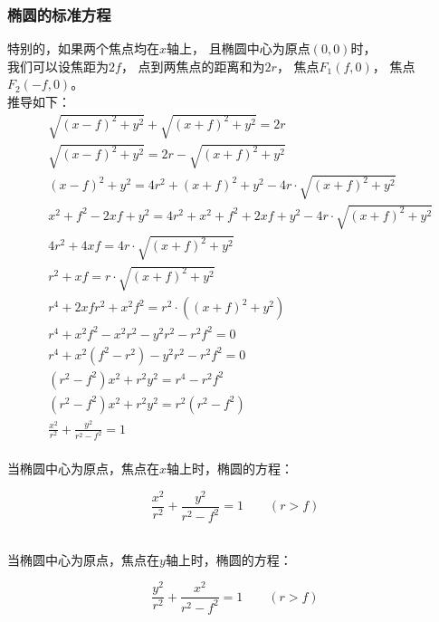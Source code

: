 \documentclass[UTF8]{ctexart}
\begin{document}
\subsubsection{椭圆的标准方程}
    特别的，如果两个焦点均在$x$轴上，
    且椭圆中心为原点$(0,0)$时，\\
    我们可以设焦距为$2f$，
    点到两焦点的距离和为$2r$，
    焦点$F_1(f,0)$，
    焦点$F_2(-f,0)$。\\[3mm]
    推导如下：\vspace{3pt}
    \setcounter{equation}{0}
    \begin{align}
        &\sqrt{(x-f)^2+y^2}+\sqrt{(x+f)^2+y^2}=2r\\[4mm]
        &\sqrt{(x-f)^2+y^2}=2r-\sqrt{(x+f)^2+y^2}\\[4mm]
        &(x-f)^2+y^2=4r^2+(x+f)^2+y^2-4r \cdot \sqrt{(x+f)^2+y^2}\\[4mm]
        &x^2+f^2-2xf+y^2=4r^2+x^2+f^2+2xf+y^2-4r \cdot \sqrt{(x+f)^2+y^2}\\[4mm]
        &4r^2+4xf=4r \cdot \sqrt{(x+f)^2+y^2}\\[4mm]
        &r^2+xf=r \cdot \sqrt{(x+f)^2+y^2}\\[4mm]
        &r^4+2xfr^2+x^2f^2=r^2 \cdot ((x+f)^2+y^2)\\[4mm]
        &r^4+x^2f^2-x^2r^2-y^2r^2-r^2f^2=0\\[4mm]
        &r^4+x^2(f^2-r^2)-y^2r^2-r^2f^2=0\\[4mm]
        &(r^2-f^2)x^2+r^2y^2=r^4-r^2f^2\\[4mm]
        &(r^2-f^2)x^2+r^2y^2=r^2(r^2-f^2)\\[4mm]
        &\frac{x^2}{r^2}+\frac{y^2}{r^2-f^2}=1
    \end{align}\\[1mm]
    当椭圆中心为原点，焦点在$x$轴上时，椭圆的方程：\\
    \begin{large}
        \begin{equation*}
            \frac{x^2}{r^2}+\frac{y^2}{r^2-f^2}=1\qquad(r>f)
        \end{equation*}
    \end{large}\\[1mm]
    当椭圆中心为原点，焦点在$y$轴上时，椭圆的方程：\\
    \begin{large}
        \begin{equation*}
            \frac{y^2}{r^2}+\frac{x^2}{r^2-f^2}=1\qquad(r>f)
        \end{equation*}
    \end{large}
\end{document}

